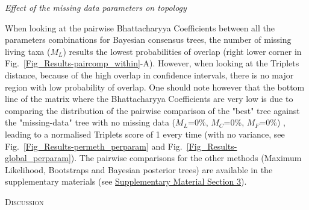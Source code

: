 \documentclass[12pt,letterpaper]{article}
\renewcommand{\section}[1]{%
\bigskip
\begin{center}
\begin{Large}
\normalfont\scshape #1
\medskip
\end{Large}
\end{center}}
\renewcommand{\subsection}[1]{%
\bigskip
\begin{center}
\begin{large}
\normalfont\itshape #1
\end{large}
\end{center}}
\begin{document}
\subsection{Effect of the missing data parameters on topology}

\label{Fig_Results-paircomp_within}

When looking at the pairwise Bhattacharyya Coefficients between all the parameters combinations for Bayesian consensus trees, the number of missing living taxa ($M_{L}$) results the lowest probabilities of overlap (right lower corner in Fig.~\ref{Fig_Results-paircomp_within}-A). However, when looking at the Triplets distance, because of the high overlap in confidence intervals, there is no major region with low probability of overlap. One should note however that the bottom line of the matrix where the Bhattacharyya Coefficients are very low is due to comparing the distribution of the pairwise comparison of the "best" tree against the "missing-data" tree with no missing data ($M_{L}$=0\%, $M_{C}$=0\%, $M_{F}$=0\%) , leading to a normalised Triplets score of 1 every time (with no variance, see Fig.~\ref{Fig_Results-permeth_perparam} and Fig.~\ref{Fig_Results-global_perparam}). The pairwise comparisons for the other methods (Maximum Likelihood, Bootstraps and Bayesian posterior trees) are available in the supplementary materials (see \hyperref[SupplementaryMaterial]{Supplementary Material Section 3}).

%
%

\section{Discussion}
\end{document}
